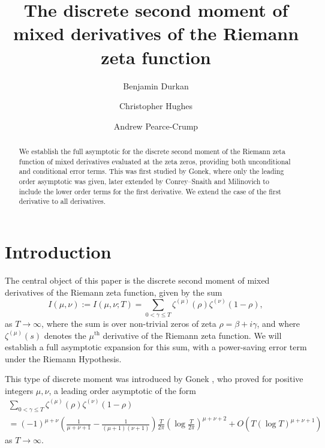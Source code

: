 \documentclass[12pt, a4paper,reqno]{amsart}
\theoremstyle{definition}
\numberwithin{equation}{section}
\begin{document}
\title[The second discrete moment of the Riemann zeta function]{The discrete second moment of mixed derivatives of the Riemann zeta function}
\author[B. Durkan]{Benjamin Durkan}
\address{Department of Mathematics, The University of Manchester, Oxford Road, Manchester, M13 9PL}
\author[C. Hughes]{Christopher Hughes}
\address{Department of Mathematics, University of York, York, YO10 5GH, United Kingdom}
\author[A. Pearce-Crump]{Andrew Pearce-Crump}
\address{School of Mathematics, Fry Building, Woodland Road, Bristol, BS8 1UG, United Kingdom}
\date{}
	


\begin{abstract}
We establish the full asymptotic for the discrete second moment of the Riemann zeta function of mixed derivatives evaluated at the zeta zeros, providing both unconditional and conditional error terms. This was first studied by Gonek, where only the leading order asymptotic was given, later extended by Conrey--Snaith and Milinovich to include the lower order terms for the first derivative. We extend the case of the first derivative to all derivatives.
\end{abstract}





\maketitle



\section{Introduction}
The central object of this paper is the discrete second moment of mixed derivatives of the Riemann zeta function, given by the sum
\begin{equation}\label{eq:main_eq}
    I(\mu,\nu):=I(\mu,\nu;T)=\sum_{0<\gamma\le T}\zeta^{(\mu)}(\rho)\zeta^{(\nu)}(1-\rho),
\end{equation}
as $T\to\infty$, where the sum is over non-trivial zeros of zeta $\rho=\beta+i\gamma$, and where $\zeta^{(\mu)}(s)$ denotes the $\mu^{\text{th}}$ derivative of the Riemann zeta function. We will establish a full asymptotic expansion for this sum, with a power-saving error term under the Riemann Hypothesis.

This type of discrete moment was introduced by Gonek \cite{Gonek1984}, who proved for positive integers $\mu,\nu$, a leading order asymptotic of the form \begin{multline}\label{eq:gonek_general}
    \sum_{0<\gamma\le T}\zeta^{(\mu)}(\rho)\zeta^{(\nu)}(1-\rho) \\ =
    (-1)^{\mu+\nu}\left(\frac{1}{\mu+\nu+1}-\frac{1}{(\mu+1)(\nu+1)}\right)\frac{T}{2\pi}\left(\log \frac{T}{2\pi}\right)^{\mu+\nu+2}+O\left(T(\log T)^{\mu+\nu+1}\right)
\end{multline}
as $T\to\infty$.
\end{document}
